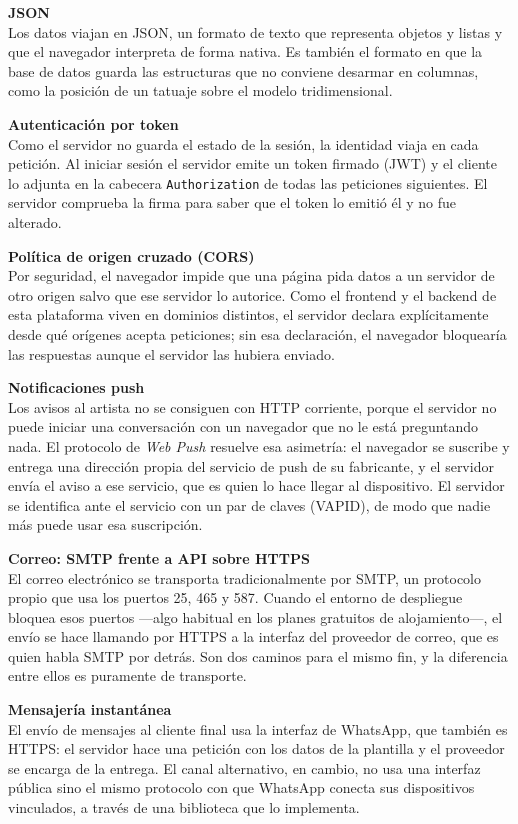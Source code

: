 \documentclass[12pt,letterpaper,oneside]{report}
\newcommand{\tituloparpegado}[1]{\par\textbf{#1}\\\indent\ignorespaces}
\begin{document}
\tituloparpegado{JSON}
Los datos viajan en JSON\cite{bray2017}, un formato de texto que representa objetos y listas y que el navegador interpreta de forma nativa. Es también el formato en que la base de datos guarda las estructuras que no conviene desarmar en columnas, como la posición de un tatuaje sobre el modelo tridimensional.

\tituloparpegado{Autenticación por token}
Como el servidor no guarda el estado de la sesión, la identidad viaja en cada petición. Al iniciar sesión el servidor emite un token firmado (JWT) y el cliente lo adjunta en la cabecera \texttt{Authorization} de todas las peticiones siguientes. El servidor comprueba la firma para saber que el token lo emitió él y no fue alterado.

\tituloparpegado{Política de origen cruzado (CORS)}
Por seguridad, el navegador impide que una página pida datos a un servidor de otro origen salvo que ese servidor lo autorice. Como el frontend y el backend de esta plataforma viven en dominios distintos, el servidor declara explícitamente desde qué orígenes acepta peticiones; sin esa declaración, el navegador bloquearía las respuestas aunque el servidor las hubiera enviado.

\tituloparpegado{Notificaciones push}
Los avisos al artista no se consiguen con HTTP corriente, porque el servidor no puede iniciar una conversación con un navegador que no le está preguntando nada. El protocolo de \textit{Web Push} resuelve esa asimetría: el navegador se suscribe y entrega una dirección propia del servicio de push de su fabricante, y el servidor envía el aviso a ese servicio, que es quien lo hace llegar al dispositivo. El servidor se identifica ante el servicio con un par de claves (VAPID), de modo que nadie más puede usar esa suscripción.

\tituloparpegado{Correo: SMTP frente a API sobre HTTPS}
El correo electrónico se transporta tradicionalmente por SMTP, un protocolo propio que usa los puertos 25, 465 y 587. Cuando el entorno de despliegue bloquea esos puertos —algo habitual en los planes gratuitos de alojamiento—, el envío se hace llamando por HTTPS a la interfaz del proveedor de correo, que es quien habla SMTP por detrás. Son dos caminos para el mismo fin, y la diferencia entre ellos es puramente de transporte.

\vspace{1cm}

\tituloparpegado{Mensajería instantánea}
El envío de mensajes al cliente final usa la interfaz de WhatsApp\cite{whatsappapi}, que también es HTTPS: el servidor hace una petición con los datos de la plantilla y el proveedor se encarga de la entrega. El canal alternativo, en cambio, no usa una interfaz pública sino el mismo protocolo con que WhatsApp conecta sus dispositivos vinculados, a través de una biblioteca que lo implementa\cite{baileys}.
\end{document}
